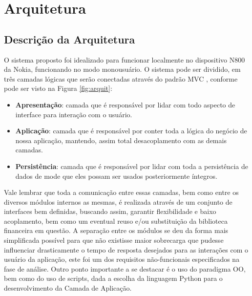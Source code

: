 \chapter{Arquitetura}


\section{Descrição da Arquitetura}

O sistema proposto foi idealizado para funcionar localmente no dispositivo N800 da Nokia, funcionando no modo monousuário. O sistema pode ser dividido, em três camadas lógicas que serão conectadas através do padrão MVC \cite{mvc}, conforme pode ser visto na Figura \ref{fig:arquit}:
\begin{itemize}
 \item \textbf{Apresentação}: camada que é responsável por lidar com todo aspecto de interface para interação com o usuário.
 \item \textbf{Aplicação}: camada que é responsável por conter toda a lógica do negócio de nossa aplicação, mantendo, assim total desacoplamento com as demais camadas.
 \item \textbf{Persistência}: camada que é responsável por lidar com toda a persistência de dados de mode que eles possam ser usados posteriormente íntegros.
\end{itemize}

Vale lembrar que toda a comunicação entre essas camadas, bem como entre os diversos módulos internos as mesmas, é realizada através de um conjunto de interfaces bem definidas, buscando assim, garantir flexibilidade e baixo acoplamento, bem como um eventual reuso e/ou substituição da biblioteca financeira em questão. A separação entre os módulos se deu da forma mais simplificada possível para que não existisse maior sobrecarga que pudesse influenciar drasticamente o tempo de resposta desejados para as interações com o usuário da aplicação, este foi um dos requisitos não-funcionais especificados na fase de análise.
Outro ponto importante a se destacar é o uso do paradigma OO, bem como do uso de scripts, dada a escolha da linguagem Python para o desenvolvimento da Camada de Aplicação.


